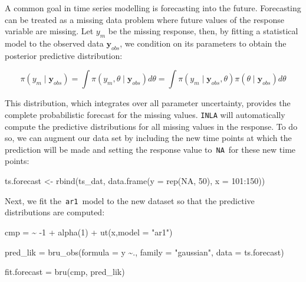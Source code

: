 \documentclass[
  letterpaper,
  DIV=11,
  numbers=noendperiod]{scrartcl}
\newenvironment{Shaded}{\begin{snugshade}}{\end{snugshade}}
\newcommand{\AttributeTok}[1]{\textcolor[rgb]{0.40,0.45,0.13}{#1}}
\newcommand{\ConstantTok}[1]{\textcolor[rgb]{0.56,0.35,0.01}{#1}}
\newcommand{\DecValTok}[1]{\textcolor[rgb]{0.68,0.00,0.00}{#1}}
\newcommand{\ErrorTok}[1]{\textcolor[rgb]{0.68,0.00,0.00}{#1}}
\newcommand{\FunctionTok}[1]{\textcolor[rgb]{0.28,0.35,0.67}{#1}}
\newcommand{\NormalTok}[1]{\textcolor[rgb]{0.00,0.23,0.31}{#1}}
\newcommand{\OtherTok}[1]{\textcolor[rgb]{0.00,0.23,0.31}{#1}}
\newcommand{\SpecialCharTok}[1]{\textcolor[rgb]{0.37,0.37,0.37}{#1}}
\newcommand{\StringTok}[1]{\textcolor[rgb]{0.13,0.47,0.30}{#1}}
\begin{document}
A common goal in time series modelling is forecasting into the future.
Forecasting can be treated as a missing data problem where future values
of the response variable are missing. Let \(y_m\) be the missing
response, then, by fitting a statistical model to the observed data
\(\mathbf{y}_{obs}\), we condition on its parameters to obtain the
posterior predictive distribution:

\[
\pi(y_{m} \mid \mathbf{y}_{obs}) = \int \pi(y_{m}, \theta \mid \mathbf{y}_{obs})  d\theta = \int \pi(y_{m} \mid \mathbf{y}_{obs}, \theta) \pi(\theta \mid \mathbf{y}_{obs})  d\theta
\]

This distribution, which integrates over all parameter uncertainty,
provides the complete probabilistic forecast for the missing values.
\texttt{INLA} will automatically compute the predictive distributions
for all missing values in the response. To do so, we can augment our
data set by including the new time points at which the prediction will
be made and setting the response value to~\texttt{NA}~for these new time
points:

\begin{Shaded}
\begin{Highlighting}[]
\NormalTok{ts.forecast }\OtherTok{\textless{}{-}} \FunctionTok{rbind}\NormalTok{(ts\_dat, }
  \FunctionTok{data.frame}\NormalTok{(}\AttributeTok{y =} \FunctionTok{rep}\NormalTok{(}\ConstantTok{NA}\NormalTok{, }\DecValTok{50}\NormalTok{), }\AttributeTok{x =} \DecValTok{101}\SpecialCharTok{:}\DecValTok{150}\NormalTok{))}
\end{Highlighting}
\end{Shaded}

Next, we fit the~\texttt{ar1}~model to the new dataset so that the
predictive distributions are computed:

\begin{Shaded}
\begin{Highlighting}[]
\NormalTok{cmp }\OtherTok{=}  \ErrorTok{\textasciitilde{}} \SpecialCharTok{{-}}\DecValTok{1} \SpecialCharTok{+} \FunctionTok{alpha}\NormalTok{(}\DecValTok{1}\NormalTok{) }\SpecialCharTok{+} \FunctionTok{ut}\NormalTok{(x,}\AttributeTok{model =} \StringTok{"ar1"}\NormalTok{)}

\NormalTok{pred\_lik }\OtherTok{=}  \FunctionTok{bru\_obs}\NormalTok{(}\AttributeTok{formula =}\NormalTok{ y }\SpecialCharTok{\textasciitilde{}}\NormalTok{.,}
            \AttributeTok{family =} \StringTok{"gaussian"}\NormalTok{,}
            \AttributeTok{data =}\NormalTok{ ts.forecast)}

\NormalTok{fit.forecast }\OtherTok{=} \FunctionTok{bru}\NormalTok{(cmp, pred\_lik)}
\end{Highlighting}
\end{Shaded}
\end{document}
